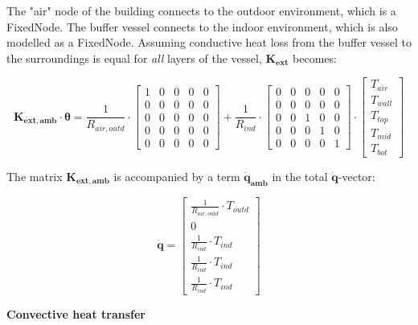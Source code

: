 The "air" node of the building connects to the outdoor environment, which is a \textsf{FixedNode}. The buffer vessel connects to the indoor environment, which is also modelled as a \textsf{FixedNode}. Assuming conductive heat loss from the buffer vessel to the surroundings is equal for \emph{all} layers of the vessel, $\mathbf{K_{ext}}$ becomes:

\begin{equation}
	\mathbf{K_{ext,amb}} \cdot \boldsymbol{\theta} = 
	\frac{1}{R_{air,outd}} \cdot
	\begin{bmatrix}
		1 & 0 & 0 & 0 & 0 \\
		0 & 0 & 0 & 0 & 0 \\
		0 & 0 & 0 & 0 & 0 \\
		0 & 0 & 0 & 0 & 0 \\
		0 & 0 & 0 & 0 & 0  
	\end{bmatrix}
    +
	\frac{1}{R_{ind}} \cdot
	\begin{bmatrix}
		0 & 0 & 0 & 0 & 0 \\
		0 & 0 & 0 & 0 & 0 \\
		0 & 0 &  1 & 0 & 0 \\
		0 & 0 & 0 &  1 & 0 \\
		0 & 0 & 0 & 0 & 1  
	\end{bmatrix}
	\cdot
	\begin{bmatrix}
		T_{air} \\
		T_{wall} \\
		T_{top} \\
		T_{mid} \\
		T_{bot}
	\end{bmatrix}
\end{equation}


The matrix $\mathbf{K_{ext,amb}}$ is accompanied by a term $\mathbf{\dot{q}_{amb}}$ in the total $\mathbf{\dot{q}}$-vector:

\begin{equation}
	\mathbf{\dot{q}} = 
	\begin{bmatrix}
		\frac{1}{R_{air, outd}} \cdot T_{outd} \\
		0 \\
		\frac{1}{R_{ind}} \cdot T_{ind} \\
		\frac{1}{R_{ind}} \cdot T_{ind} \\
		\frac{1}{R_{ind}} \cdot T_{ind} 
	\end{bmatrix}
\end{equation}

\textbf{Convective heat transfer}

